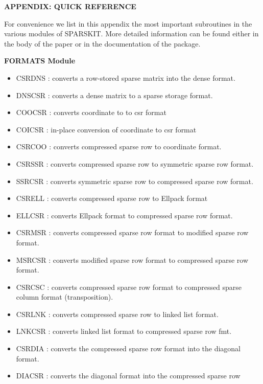 \newpage

\appendix
\centerline{\bf APPENDIX: QUICK REFERENCE}
\vskip 0.3in

For convenience we list in this 
appendix the most important subroutines in the various
modules of SPARSKIT. More detailed information can be found either
in the body of the paper or in the documentation of the package.

\vskip 0.3in
\centerline{\bf FORMATS Module} 

\begin{itemize} 

\item CSRDNS  : converts a row-stored sparse matrix into the dense format. 
\item DNSCSR  : converts a dense matrix to a sparse storage format.        
\item COOCSR  : converts coordinate to  to csr format                      
\item COICSR  : in-place conversion of coordinate to csr format            
\item CSRCOO  : converts compressed sparse row to coordinate format.
\item CSRSSR  : converts compressed sparse row to symmetric sparse row format.
\item SSRCSR  : converts symmetric sparse row to compressed sparse row format.
\item CSRELL  : converts compressed sparse row to Ellpack format           
\item ELLCSR  : converts Ellpack format to compressed sparse row format.
\item CSRMSR  : converts compressed sparse row format to modified sparse   
           row format.
\item MSRCSR  : converts modified sparse row format to compressed sparse   
           row format.
\item CSRCSC  : converts compressed sparse row format to compressed sparse 
           column format (transposition).
\item CSRLNK  : converts compressed sparse row to linked list format.
\item LNKCSR  : converts linked list format to compressed sparse row fmt.
\item CSRDIA  : converts the compressed sparse row format into the diagonal    
           format.                                                    
\item DIACSR  : converts the diagonal format into the compressed sparse row    

\end{itemize}
